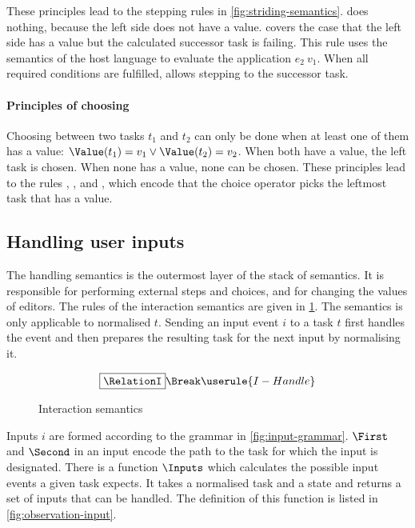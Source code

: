 These principles lead to the stepping rules in \cref{fig:striding-semantics}.
 does nothing,
because the left side does not have a value.
 covers the case that
the left side has a value but the calculated successor task is failing.
This rule uses the semantics of the host language to evaluate the application $e_2\ v_1$.
When all required conditions are fulfilled,  allows stepping to the successor task.



\paragraph{Principles of choosing}
\label{sub:choosing-principles}

Choosing between two tasks $t_1$ and $t_2$ can only be done when
at least one of them has a value: $\Value(t_1) = v_1 \lor \Value(t_2) = v_2$.
When both have a value, the left task is chosen.
When none has a value, none can be chosen.
These principles lead to the rules , , and ,
which encode that the choice operator picks the leftmost task that has a value.



\subsection{Handling user inputs}
\label{sec:handling}

The handling semantics is the outermost layer of the stack of semantics.
It is responsible for performing external steps and choices, and for changing the values of editors.
The rules of the interaction semantics are given in \cref{fig:interaction-semantics}.
The semantics is only applicable to normalised $t$.
Sending an input event $i$ to a task $t$ first handles the event and then prepares the resulting task for the next input by normalising it.

\begin{figure}[h]
  \small
  \begin{gather*}
    \boxed{\RelationI} \Break
    \userule{I-Handle}
  \end{gather*}
  \caption{Interaction semantics} \label{fig:interaction-semantics}
\end{figure}

Inputs $i$ are formed according to the grammar in \cref{fig:input-grammar}.
$\First$ and $\Second$ in an input encode the path to the task for which the input is designated.
%
There is a function $\Inputs$ which calculates the possible input events a given task expects.
It takes a normalised task and a state and returns a set of inputs that can be handled.
The definition of this function is listed in \cref{fig:observation-input}.


